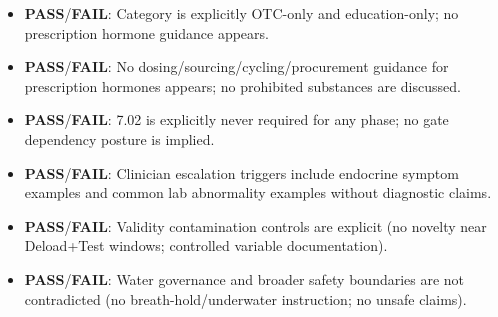 \documentclass[10pt]{article}
\begin{document}
\begin{itemize}
\item \textbf{PASS}/\textbf{FAIL}: Category is explicitly OTC-only and education-only; no prescription hormone guidance appears.
\item \textbf{PASS}/\textbf{FAIL}: No dosing/sourcing/cycling/procurement guidance for prescription hormones appears; no prohibited substances are discussed.
\item \textbf{PASS}/\textbf{FAIL}: 7.02 is explicitly never required for any phase; no gate dependency posture is implied.
\item \textbf{PASS}/\textbf{FAIL}: Clinician escalation triggers include endocrine symptom examples and common lab abnormality examples without diagnostic claims.
\item \textbf{PASS}/\textbf{FAIL}: Validity contamination controls are explicit (no novelty near Deload+Test windows; controlled variable documentation).
\item \textbf{PASS}/\textbf{FAIL}: Water governance and broader safety boundaries are not contradicted (no breath-hold/underwater instruction; no unsafe claims).
\end{itemize}
\end{document}
